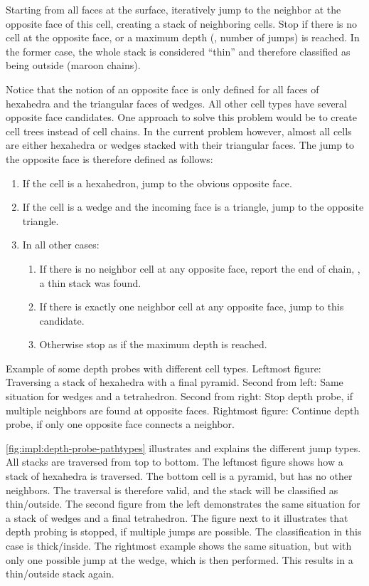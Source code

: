 Starting from all faces at the surface, iteratively jump to the neighbor at the opposite face of this cell, creating a stack of neighboring cells. Stop if there is no cell at the opposite face, or a maximum depth (\ie, number of jumps) is reached. In the former case, the whole stack is considered ``thin'' and therefore classified as being outside (maroon chains).

Notice that the notion of an opposite face is only defined for all faces of hexahedra and the triangular faces of wedges. All other cell types have several opposite face candidates. One approach to solve this problem would be to create cell trees instead of cell chains. In the current problem however, almost all cells are either hexahedra or wedges stacked with their triangular faces. The jump to the opposite face is therefore defined as follows:
\begin{enumerate}
%
  \item If the cell is a hexahedron, jump to the obvious opposite face.
%
  \item If the cell is a wedge and the incoming face is a triangle, jump to the opposite triangle.
%
  \item In all other cases:
  \begin{enumerate}
    \item If there is no neighbor cell at any opposite face, report the end of chain, \ie, a thin stack was found.
    \item If there is exactly one neighbor cell at any opposite face, jump to this candidate.
    \item Otherwise stop as if the maximum depth is reached.
  \end{enumerate}
%
\end{enumerate}

{Example of some depth probes with different cell types. Leftmost figure: Traversing a stack of hexahedra with a final pyramid. Second from left: Same situation for wedges and a tetrahedron. Second from right: Stop depth probe, if multiple neighbors are found at opposite faces. Rightmost figure: Continue depth probe, if only one opposite face connects a neighbor.}



\autoref{fig:impl:depth-probe-pathtypes} illustrates and explains the different jump types.
All stacks are traversed from top to bottom. The leftmost figure shows how a stack of hexahedra is traversed. The bottom cell is a pyramid, but has no other neighbors. The traversal is therefore valid, and the stack will be classified as thin\slash outside. The second figure from the left demonstrates the same situation for a stack of wedges and a final tetrahedron. The figure next to it illustrates that depth probing is stopped, if multiple jumps are possible. The classification in this case is thick\slash inside. The rightmost example shows the same situation, but with only one possible jump at the wedge, which is then performed. This results in a thin\slash outside stack again.

